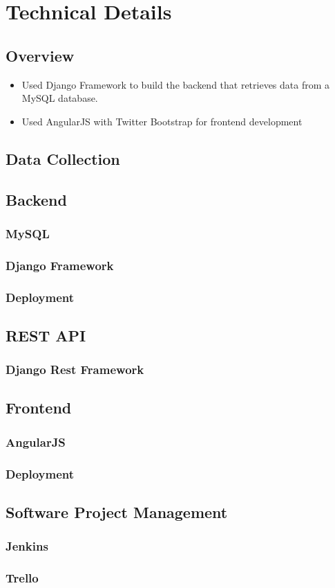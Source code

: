 \chapter{Technical Details}

\section{Overview}
\begin{itemize}
\item Used Django Framework to build the backend that retrieves data from a MySQL database. 

\item Used AngularJS with Twitter Bootstrap for frontend development
\end{itemize}

\section{Data Collection}

\section{Backend}
	\subsection{MySQL}
	\subsection{Django Framework}
	\subsection{Deployment}

\section{REST API}
	\subsection{Django Rest Framework}

\section{Frontend}
	\subsection{AngularJS}
	\subsection{Deployment}

\section{Software Project Management}
	\subsection{Jenkins}
	\subsection{Trello}